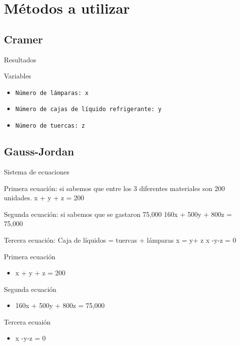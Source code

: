 \documentclass[10pt,xcolor={dvipsnames}]{beamer}
\begin{document}
\section{Métodos a utilizar}
\subsection{Cramer}
\begin{frame}{Resultados}

\begin{block}{}
Variables
\begin{itemize}
    \item {\tt Número de lámparas: x}
    \item {\tt Número de cajas de líquido refrigerante: y}
    \item {\tt Número de tuercas: z}
  \end{itemize}
\end{block}
\end{frame}

\subsection{Gauss-Jordan}
\begin{frame}{Sistema de ecuaciones}
  \item {Primera ecuación: si sabemos que entre los 3 diferentes materiales son 200 unidades. 
x + y + z = 200}
\item {Segunda ecuación: si sabemos que se gastaron 75,000
160x + 500y + 800z = 75,000}
\item{Tercera ecuación: Caja de líquidos = tuercas + lámparas
x = y+ z
x -y-z = 0}

  \pause
  \begin{block}{Primera ecuación}
  \begin{itemize}    
    \item x + y + z = 200
  \end{itemize}
  \end{block}

  \begin{block}{Segunda ecuación}
  \begin{itemize}
     \item 160x + 500y + 800z = 75,000 
  \end{itemize}
  \end{block}
  
  \begin{block}{Tercera ecuaión}
  \begin{itemize}
     \item x -y-z = 0
  \end{itemize}
  \end{block}
\end{frame}
     
\end{document}

